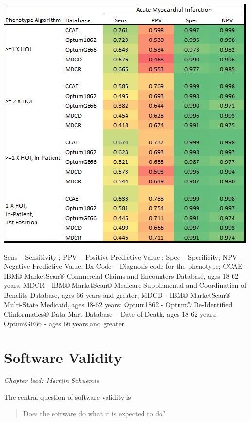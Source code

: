\documentclass[11pt]{book}
\theoremstyle{definition}
\theoremstyle{definition}
\theoremstyle{definition}
\theoremstyle{remark}
\begin{document}
\begin{center}\includegraphics[width=0.75\linewidth]{images/ClinicalValidity/figure6} \end{center}

Sens -- Sensitivity ; PPV -- Positive Predictive Value ; Spec -- Specificity; NPV -- Negative Predictive Value; Dx Code -- Diagnosis code for the phenotype; CCAE - IBM® MarketScan® Commercial Claims and Encounters Database, ages 18-62 years; MDCR - IBM® MarketScan® Medicare Supplemental and Coordination of Benefits Database, ages 66 years and greater; MDCD - IBM® MarketScan® Multi-State Medicaid, ages 18-62 years; Optum1862 - Optum© De-Identified Clinformatics® Data Mart Database -- Date of Death, ages 18-62 years; OptumGE66 - ages 66 years and greater

\hypertarget{SoftwareValidity}{%
\chapter{Software Validity}\label{SoftwareValidity}}

\emph{Chapter lead: Martijn Schuemie}

The central question of software validity is

\begin{quote}
Does the software do what it is expected to do?
\end{quote}
\end{document}

